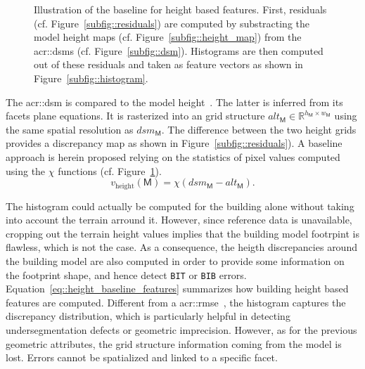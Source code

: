         \begin{figure}[htb]
            \centering
            
            \caption[
                Illustration of the baseline for height based features.
            ]{
                \label{fig::height_baseline_features}
                Illustration of the baseline for height based features.
                First, residuals (cf. Figure~\ref{subfig::residuals}) are computed by substracting the model height maps (cf. Figure~\ref{subfig::height_map}) from the \glspl{acr::dsm} (cf. Figure~\ref{subfig::dsm}).
                Histograms are then computed out of these residuals and taken as feature vectors as shown in Figure~\ref{subfig::histogram}.
            }
        \end{figure}

        The \gls{acr::dsm} is compared to the model height~\parencite{bredif20073d,zebedin2008fusion}.
        The latter is inferred from its facets plane equations.
        It is rasterized into an grid structure $alt_{\mathsf{M}} \in \mathbb{R}^{h_{\mathsf{M}} \times w_{\mathsf{M}}}$ using the same spatial resolution as $dsm_{\mathsf{M}}$.
        The difference between the two height grids provides a discrepancy map as shown in Figure~\ref{subfig::residuals}).
        A baseline approach is herein proposed relying on the statistics of pixel values computed using the $\chi$ functions (cf. Figure~\ref{fig::height_baseline_features}).\\

        \begin{equation}
            \label{eq::height_baseline_features}
            v_{\text{height}}\left(\mathsf{M}\right) = \chi \left( dsm_{\mathsf{M}} - alt_{\mathsf{M}} \right).
        \end{equation}

        The histogram could actually be computed for the building alone without taking into account the terrain arround it.
        However, since reference data is unavailable, cropping out the terrain height values implies that the building model footrpint is flawless, which is not the case.
        As a consequence, the heigth discrepancies around the building model are also computed in order to provide some information on the footprint shape, and hence detect \texttt{BIT} or \texttt{BIB} errors.\\

        Equation~\ref{eq::height_baseline_features} summarizes how building height based features are computed.
        Different from a \gls{acr::rmse}~\parencite{lafarge2012creating,poullis2013framework}, the histogram captures the discrepancy distribution, which is particularly helpful in detecting undersegmentation defects or geometric imprecision.
        However, as for the previous geometric attributes, the grid structure information coming from the model is lost.
        Errors cannot be spatialized and linked to a specific facet.

